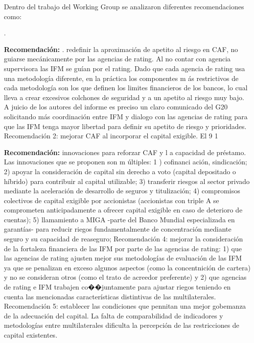 \documentclass[10pt,a4paper]{article}
\newcounter{numitem}
\newenvironment{lnum}
      {\begin{list}{\arabic{numitem}.}{%
          \usecounter{numitem}%
          \setlength{\leftmargin}{1cm}%
          \setlength{\parskip}{3pt}%
          \setlength{\itemsep}{0pt}%
          \setlength{\parsep}{0pt}%
      }}
      {\end{list}}
\begin{document}
Dentro del trabajo del Working Group se analizaron diferentes recomendaciones como:
\begin{lnum}
    \item \textbf{Recomendación: }. redefinir la aproximación de apetito al riesgo en CAF, no guiarse mecánicamente por las agencias de rating. Al no contar con agencia supervisora las IFM se guían por el rating. Dado que cada agencia de rating usa una metodología diferente, en la práctica los componentes m ás restrictivos de cada metodología son los que definen los limites financieros de los bancos, lo cual lleva a crear excesivos colchones de seguridad y a un apetito al riesgo muy bajo. A juicio de los autores del informe es preciso un claro comunicado del G20 solicitando más coordinación entre IFM y dialogo con las agencias de rating para que las IFM tenga mayor libertad para definir su apetito de riesgo y prioridades. Recomendación 2: mejorar CAF al incorporar el capital exigible. El 9 1 %
    \item \textbf{Recomendación: } innovaciones para reforzar CAF y l a capacidad de préstamo. Las innovaciones que se proponen son m últiples: 1 ) cofinanci ación, sindicación; 2) apoyar la consideración de capital sin derecho a voto (capital depositado o híbrido) para contribuir al capital utilizable; 3) transferir riesgos al sector privado mediante la aceleración de desarrollo de seguros y titulización; 4) compromisos colectivos de capital exigible por accionistas (accionistas con triple A se comprometen anticipadamente a ofrecer capital exigible en caso de deterioro de cuentas); 5) llamamiento a MIGA -parte del Banco Mundial especializada en garantías- para reducir riegos fundamentalmente de concentración mediante seguro y su capacidad de reaseguro;
    Recomendación 4: mejorar la consideración de la fortaleza financiera de las IFM por parte de las agencias de rating: 1) que las agencias de rating ajusten mejor sus metodologías de evaluación de las IFM ya que se penalizan en exceso algunos aspectos (como la concentnición de cartera) y no se consideran otros (como el trato de acreedor preferente) y 2) que agencias de rating e IFM trabajen co��juntamente para ajustar riegos teniendo en cuenta las mencionadas características distintivas de las multilaterales. Recomendación 5: establecer las condiciones que pennitan una mejor gobemanza de la adecuación del capital. La falta de comparabilidad de indicadores y metodologías entre multilaterales dificulta la percepción de las restricciones de capital existentes.
\end{lnum}
\end{document}
